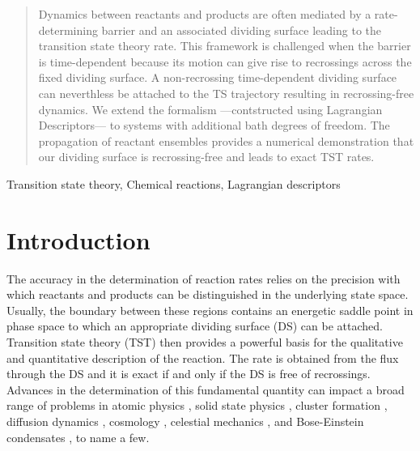 \documentclass{elsarticle}
\begin{document}
\begin{abstract}\label{sec:abstract}%
Dynamics between reactants and products are often mediated by
a rate-deter\-mining barrier
and an associated dividing surface
leading to the transition state theory rate.
This
framework is challenged when the barrier is time-dependent
because its motion can give rise to recrossings across the
fixed dividing surface.
A non-recrossing
time-dependent dividing surface can neverthless be attached to the TS trajectory
resulting in recrossing-free dynamics.
We extend the formalism
---contstructed using Lagrangian Descriptors---
to systems with additional bath degrees of freedom.
The propagation of
reactant ensembles provides a numerical demonstration that our
dividing surface is recrossing-free and leads to exact TST
rates.
\end{abstract}
\begin{keyword}
Transition state theory,
Chemical reactions,
Lagrangian descriptors
\end{keyword}
\maketitle




\section{Introduction}

The accuracy in the determination of reaction rates relies on the
precision with which 
reactants and products can be distinguished 
in the underlying state space.
% 
Usually, the boundary between
these regions contains an energetic saddle point in phase space 
to which an appropriate dividing surface (DS) can be attached.
Transition state theory (TST)
\cite{pitzer,pechukas1981,truh79,truh85,hynes85b,berne88,nitzan88,rmp90,truhlar91,truh96,truh2000,%
Komatsuzaki2001,pollak05a,Waalkens2008,hern08d,Komatsuzaki2010,hern10a,Henkelman2016}
then provides a powerful basis for the qualitative and quantitative description 
of the reaction. 
The rate is obtained from the flux through the DS and it is exact if and 
only if the DS is free of recrossings. 
Advances in the determination of this fundamental quantity can 
impact a broad range of problems in
atomic physics \cite{Jaffe00},
solid state physics \cite{Jacucci1984},
cluster formation \cite{Komatsuzaki99, Komatsuzaki02},
diffusion dynamics \cite{toller, voter02b},
cosmology \cite{Oliveira02}, 
celestial mechanics \cite{Jaffe02, Waalkens2005b},
and Bose-Einstein condensates \cite{Huepe1999, Huepe2003, Junginger2012a, 
Junginger2012b, Junginger2013b},
to name a few.
\end{document}
